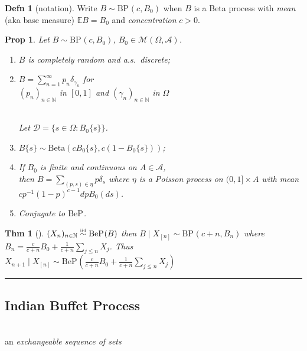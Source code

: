 \documentclass[reqno,oneside,twocolumn,8pt]{amsart}
\newtheorem*{thm}{{\color{BrickRed}Thm}}
\newtheorem*{prop}{{\color{BrickRed}Prop}}
\theoremstyle{definition}
\newtheorem*{definition}{{\color{OliveGreen}Defn}}
\theoremstyle{remark}
\newcommand{\nprocess}[3]{(#1_{#3})_{#3 \in #2}}
\newcommand{\bspace}{\Omega}
\newcommand{\bsa}{\mathcal A}
\newcommand{\borelspace}{(\bspace,\bsa)}
\newcommand{\Measures}{\mathcal M}
\newcommand{\dist}{\sim}
\newcommand{\Nats}{\mathbb{N}}
\newcommand{\distiid}{\overset{\textrm{\tiny iid}}{\dist}}\newcommand{\given}{\mid}
\newcommand{\process}[2]{\nprocess #1 #2 n}
\newcommand{\thelaw}{}%
\newcommand{\Beta}{\mathrm{Beta}}
\newcommand{\BPLAW}{\mathrm{BP}_{\thelaw}}
\newcommand{\BePLAW}{\mathrm{BeP_{\thelaw}}}
\newcommand{\EE}{\mathbb{E}}
\begin{document}
\vspace{1em}
\begin{definition}[notation]
Write $B \dist \BPLAW(c,B_0)$ when $B$ is a 
Beta process with 
\emph{mean} (aka base measure) $\EE B = B_0$ 
and \emph{concentration} $c>0$.
\end{definition}

\begin{prop}%
Let $B \dist \BPLAW(c,B_0)$, $B_0 \in \Measures \borelspace$.
\begin{enumerate}

\item $B$ is completely random and a.s.\ discrete; 
\item $B = \sum_{n=1}^\infty p_n \delta_{\gamma_n}$ for \hfill \\
\hfill $\process p \Nats$ in $[0,1]$ and $\process \gamma \Nats$ in $\bspace$
\vspace{-0.5em}

\ \\
Let $\mathcal D = \{ s \in \bspace : B_0\{s\} \}$.
\vspace{.5em}


\item 
$B\{s\} \dist \Beta(c B_0\{s\},c(1-B_0\{s\}))$;

\item
If $B_0$ is finite and continuous on $A \in \bsa$, \\
then $B = \sum_{(p,s) \in \eta} p \delta_s$ where $\eta$ is a Poisson process on $(0,1] \times A$ with mean \\ $c p^{-1} (1-p)^{c-1} dp B_0(ds)$.

\item 
Conjugate to $\BePLAW$.

\end{enumerate}
\end{prop}

\begin{thm}[{\citep{Hjort90,Kim99}}]
$\process X \Nats \distiid \BePLAW(B)$ then
$B \given X_{[n]} \dist \BPLAW(c+n,B_n)$
where \\
$B_n = \frac c {c+n} B_0 + \frac 1 {c+n} \sum_{j\le n} X_j$.
Thus\\
$X_{n+1} \given X_{[n]} \dist \BePLAW(\frac c {c+n} B_0 + \frac 1 {c+n} \sum_{j\le n} X_j)$
\end{thm}

\hrule
\subsection{Indian Buffet Process}\hfill\\
an \emph{exchangeable sequence of sets}\vspace{-.3em}
\end{document}
